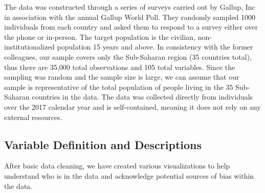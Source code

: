 \documentclass[12pt]{article}
\begin{document}
The data was constructed through a series of surveys carried out by
Gallup, Inc in association with the annual Gallup World Poll. They
randomly sampled 1000 individuals from each country and asked them to
respond to a survey either over the phone or in-person. The target
population is the civilian, non-institutionalized population 15 years
and above. In consistency with the former colleagues, our sample covers
only the Sub-Saharan region (35 countries total), thus there are 35,000
total observations and 105 total variables. Since the sampling was
random and the sample size is large, we can assume that our sample is
representative of the total population of people living in the 35
Sub-Saharan countries in the data. The data was collected directly from
individuals over the 2017 calendar year and is self-contained, meaning
it does not rely on any external resources.

\hypertarget{variable-definition-and-descriptions}{%
\subsection{Variable Definition and
Descriptions}\label{variable-definition-and-descriptions}}

After basic data cleaning, we have created various visualizations to
help understand who is in the data and acknowledge potential sources of
bias within the data.
\end{document}
